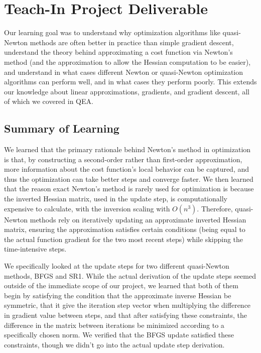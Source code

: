 \documentclass[12pt]{article}
\begin{document}
\section{Teach-In Project Deliverable}

Our learning goal was to understand why optimization algorithms like quasi-Newton methods are often 
better in practice than simple gradient descent, understand the theory behind approximating a cost function
via Newton's method (and the approximation to allow the Hessian computation to be easier), and understand in what 
cases different Newton or quasi-Newton optimization algorithms can perform well, and in what cases they perform poorly.
This extends our knowledge about linear approximations, gradients, and gradient descent, all of which we covered
in QEA.

\subsection{Summary of Learning}

We learned that the primary rationale behind Newton's method in optimization is that, by constructing a 
second-order rather than first-order approximation, more information about the cost function's local behavior
can be captured, and thus the optimization can take better steps and converge faster. We then learned that the reason
exact Newton's method is rarely used for optimization is because the inverted Hessian matrix, used in the update step, is
computationally expensive to calculate, with the inversion scaling with \(O(n^3)\). Therefore, quasi-Newton methods rely
on iteratively updating an approximate inverted Hessian matrix, ensuring the approximation satisfies certain conditions
(being equal to the actual function gradient for the two most recent steps) while skipping the time-intensive steps.

We specifically looked at the update steps for two different quasi-Newton methods, BFGS and SR1. While the actual derivation
of the update steps seemed outside of the immediate scope of our project, we learned that both of them begin by satisfying the condition
that the approximate inverse Hessian be symmetric, that it give the iteration step vector when multiplying the difference in gradient
value between steps, and that after satisfying these constraints, the difference in the matrix between iterations be minimized according
to a specifically chosen norm. We verified that the BFGS update satisfied these constraints, though we didn't go into the actual update 
step derivation.
\end{document}
